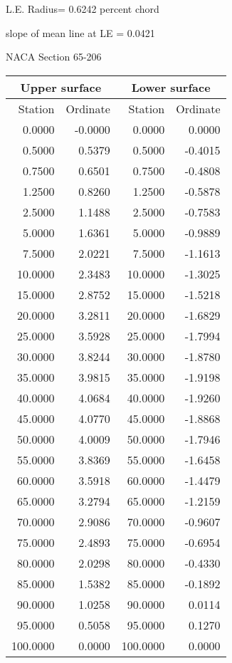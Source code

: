 \documentclass[11pt]{book}
\begin{document}
L.E. Radius=  0.6242 percent chord


 slope of mean line at LE =  0.0421
 \newpage
  \label{s65-206}
 \begin{Large}
 NACA Section 65-206
 \end{Large}
  
 \vspace{8mm}
 \begin{tabular}{|r|r|r|r|} \hline 
 \multicolumn{2}{|c|}{Upper surface} & \multicolumn{2}{|c|}{Lower surface} \\
 \hline
 Station & Ordinate & Station & Ordinate \\
 \hline
0.0000 & -0.0000 & 0.0000 & 0.0000 \\
0.5000 & 0.5379 & 0.5000 & -0.4015 \\
0.7500 & 0.6501 & 0.7500 & -0.4808 \\
1.2500 & 0.8260 & 1.2500 & -0.5878 \\
2.5000 & 1.1488 & 2.5000 & -0.7583 \\
5.0000 & 1.6361 & 5.0000 & -0.9889 \\
7.5000 & 2.0221 & 7.5000 & -1.1613 \\
10.0000 & 2.3483 & 10.0000 & -1.3025 \\
15.0000 & 2.8752 & 15.0000 & -1.5218 \\
20.0000 & 3.2811 & 20.0000 & -1.6829 \\
25.0000 & 3.5928 & 25.0000 & -1.7994 \\
30.0000 & 3.8244 & 30.0000 & -1.8780 \\
35.0000 & 3.9815 & 35.0000 & -1.9198 \\
40.0000 & 4.0684 & 40.0000 & -1.9260 \\
45.0000 & 4.0770 & 45.0000 & -1.8868 \\
50.0000 & 4.0009 & 50.0000 & -1.7946 \\
55.0000 & 3.8369 & 55.0000 & -1.6458 \\
60.0000 & 3.5918 & 60.0000 & -1.4479 \\
65.0000 & 3.2794 & 65.0000 & -1.2159 \\
70.0000 & 2.9086 & 70.0000 & -0.9607 \\
75.0000 & 2.4893 & 75.0000 & -0.6954 \\
80.0000 & 2.0298 & 80.0000 & -0.4330 \\
85.0000 & 1.5382 & 85.0000 & -0.1892 \\
90.0000 & 1.0258 & 90.0000 & 0.0114 \\
95.0000 & 0.5058 & 95.0000 & 0.1270 \\
100.0000 & 0.0000 & 100.0000 & 0.0000 \\
 \hline 
 \end{tabular}
\end{document}
